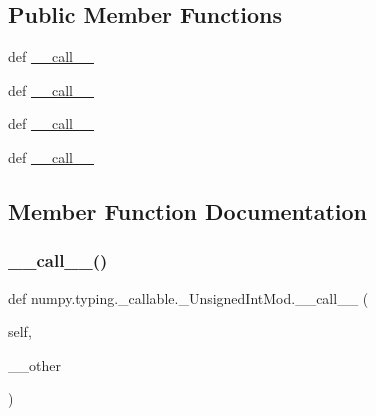 \subsection*{Public Member Functions}
\begin{DoxyCompactItemize}
\item 
def \hyperlink{classnumpy_1_1typing_1_1__callable_1_1__UnsignedIntMod_a5629e52aed202ee5e36cc8fa34e9955b}{\+\_\+\+\_\+call\+\_\+\+\_\+}
\item 
def \hyperlink{classnumpy_1_1typing_1_1__callable_1_1__UnsignedIntMod_a5629e52aed202ee5e36cc8fa34e9955b}{\+\_\+\+\_\+call\+\_\+\+\_\+}
\item 
def \hyperlink{classnumpy_1_1typing_1_1__callable_1_1__UnsignedIntMod_a5629e52aed202ee5e36cc8fa34e9955b}{\+\_\+\+\_\+call\+\_\+\+\_\+}
\item 
def \hyperlink{classnumpy_1_1typing_1_1__callable_1_1__UnsignedIntMod_a5629e52aed202ee5e36cc8fa34e9955b}{\+\_\+\+\_\+call\+\_\+\+\_\+}
\end{DoxyCompactItemize}


\subsection{Member Function Documentation}
\mbox{\label{classnumpy_1_1typing_1_1__callable_1_1__UnsignedIntMod_a5629e52aed202ee5e36cc8fa34e9955b}} 
\subsubsection{\texorpdfstring{\+\_\+\+\_\+call\+\_\+\+\_\+()}{\_\_call\_\_()}\hspace{0.1cm}{\footnotesize\ttfamily [1/4]}}
{\footnotesize\ttfamily def numpy.\+typing.\+\_\+callable.\+\_\+\+Unsigned\+Int\+Mod.\+\_\+\+\_\+call\+\_\+\+\_\+ (\begin{DoxyParamCaption}\item[{}]{self,  }\item[{}]{\+\_\+\+\_\+other }\end{DoxyParamCaption})}

